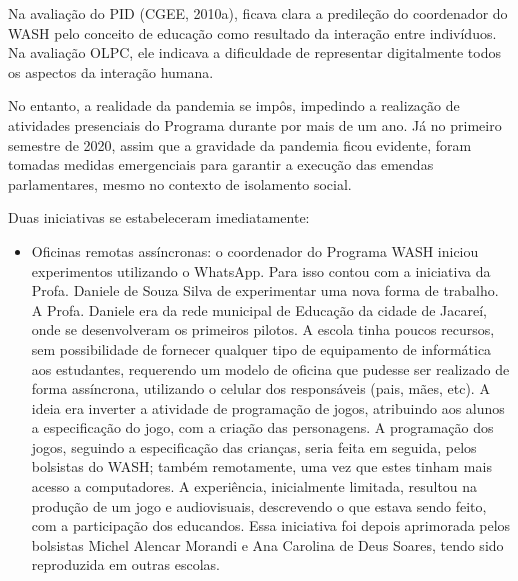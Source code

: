Na avaliação do PID (CGEE, 2010a), ficava clara a predileção do coordenador do WASH pelo conceito de educação como resultado da interação entre indivíduos. Na avaliação OLPC, ele indicava a dificuldade de representar digitalmente todos os aspectos da interação humana.

No entanto, a realidade da pandemia se impôs, impedindo a realização de atividades presenciais do Programa durante por mais de um ano. Já no primeiro semestre de 2020, assim que a gravidade da pandemia ficou evidente, foram tomadas medidas emergenciais para garantir a execução das emendas parlamentares, mesmo no contexto de isolamento social.

Duas iniciativas se estabeleceram imediatamente:


\begin{itemize}
\item Oficinas remotas assíncronas: o coordenador do Programa WASH iniciou experimentos utilizando o WhatsApp. Para isso contou com a iniciativa da Profa. Daniele de Souza Silva de experimentar uma nova forma de trabalho. A Profa. Daniele era da rede municipal de Educação da cidade de Jacareí, onde se desenvolveram os primeiros pilotos. A escola tinha poucos recursos, sem possibilidade de fornecer qualquer tipo de equipamento de informática aos estudantes, requerendo um modelo de oficina que pudesse ser realizado de forma assíncrona, utilizando o celular dos responsáveis (pais, mães, etc). A ideia era inverter a atividade de programação de jogos, atribuindo aos alunos a especificação do jogo, com a criação das personagens. A programação dos jogos, seguindo a especificação das crianças, seria feita em seguida, pelos bolsistas do WASH; também remotamente, uma vez que estes tinham mais acesso a computadores. A experiência, inicialmente limitada, resultou na produção de um jogo e audiovisuais, descrevendo o que estava sendo feito, com a participação dos educandos. Essa iniciativa foi depois aprimorada pelos bolsistas Michel Alencar Morandi e Ana Carolina de Deus Soares, tendo sido reproduzida em outras escolas.

\end{itemize}

